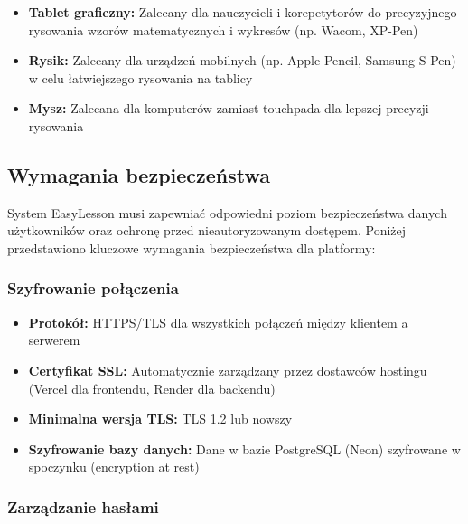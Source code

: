 \documentclass[12pt,a4paper]{article}
\begin{document}
\begin{itemize}[leftmargin=*]
    \item \textbf{Tablet graficzny:} Zalecany dla nauczycieli i korepetytorów do precyzyjnego rysowania wzorów matematycznych i wykresów (np. Wacom, XP-Pen)
    \item \textbf{Rysik:} Zalecany dla urządzeń mobilnych (np. Apple Pencil, Samsung S Pen) w celu łatwiejszego rysowania na tablicy
    \item \textbf{Mysz:} Zalecana dla komputerów zamiast touchpada dla lepszej precyzji rysowania
\end{itemize}

\subsection{Wymagania bezpieczeństwa}

System EasyLesson musi zapewniać odpowiedni poziom bezpieczeństwa danych użytkowników oraz ochronę przed nieautoryzowanym dostępem. Poniżej przedstawiono kluczowe wymagania bezpieczeństwa dla platformy:

\subsubsection{Szyfrowanie połączenia}

\begin{itemize}[leftmargin=*]
    \item \textbf{Protokół:} HTTPS/TLS dla wszystkich połączeń między klientem a serwerem
    \item \textbf{Certyfikat SSL:} Automatycznie zarządzany przez dostawców hostingu (Vercel dla frontendu, Render dla backendu)
    \item \textbf{Minimalna wersja TLS:} TLS 1.2 lub nowszy
    \item \textbf{Szyfrowanie bazy danych:} Dane w bazie PostgreSQL (Neon) szyfrowane w spoczynku (encryption at rest)
\end{itemize}

\subsubsection{Zarządzanie hasłami}
\end{document}
